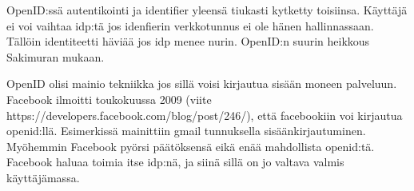 \documentclass[finnish,gradu]{tktltiki}
\begin{document}

  OpenID:ssä autentikointi ja identifier yleensä tiukasti kytketty toisiinsa. Käyttäjä ei voi vaihtaa idp:tä jos idenfierin verkkotunnus ei ole hänen hallinnassaan. Tällöin identiteetti häviää jos idp menee nurin. OpenID:n suurin heikkous Sakimuran mukaan.

  OpenID olisi mainio tekniikka jos sillä voisi kirjautua sisään moneen palveluun.
  Facebook ilmoitti toukokuussa 2009 (viite https://developers.facebook.com/blog/post/246/), että facebookiin voi kirjautua openid:llä. Esimerkissä mainittiin gmail tunnuksella sisäänkirjautuminen. Myöhemmin Facebook pyörsi päätöksensä eikä enää mahdollista openid:tä. Facebook haluaa toimia itse idp:nä, ja siinä sillä on jo valtava valmis käyttäjämassa.
\end{document}
